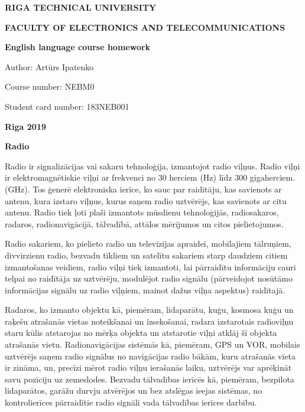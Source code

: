 \documentclass[a4paper, twoside, 12pt]{book}
\begin{document}
\thispagestyle{empty}

{\centering
	\MakeUppercase{\textbf{Riga Technical University}} \par
	\vspace{6pt}
	\MakeUppercase{\textbf{Faculty of electronics and telecommunications}} \par
	\vspace{200pt}
	{\large \textbf{English language course homework}} \par
}

\vspace{120pt}

\hfill Author: Artūrs Ipatenko

\hfill Course number: NEBM0

\hfill Student card number: 183NEB001

\vfill{}
{\centering \textbf{Riga 2019} \par}

\newpage

{\noindent \textbf{Radio}}
\vspace{6pt}

Radio ir signalizācijas vai sakaru tehnoloģija, izmantojot radio viļņus. Radio viļņi ir elektromagnētiskie viļņi ar frekvenci no 30 herciem (Hz) līdz 300 gigaherciem. (GHz). Tos ģenerē elektroniska ierīce, ko sauc par raidītāju, kas savienots ar antenu, kura izstaro viļņus, kurus saņem radio uztvērējs, kas savienots ar citu antenu. Radio tiek ļoti plaši izmantots mūsdienu tehnoloģijās, radiosakaros, radaros, radionavigācijā, tālvadībā, attālos mērījumos un citos pielietojumos.

Radio sakariem, ko pielieto radio un televīzijas apraidei, mobilajiem tālruņiem, divvirzienu radio, bezvadu tīkliem un satelītu sakariem starp daudziem citiem izmantošanas veidiem, radio viļņi tiek izmantoti, lai pārraidītu informāciju cauri telpai no raidītāja uz uztvērēju, modulējot radio signālu (pārveidojot nosūtāmo informācijas signālu uz radio viļņiem, mainot dažus viļņa aspektus) raidītajā.

Radaros, ko izmanto objektu kā, piemēram, lidaparātu, kuģu, kosmosa kuģu un raķešu atrašanās vietas noteikšanai un izsekošanai, radara izstarotais radioviļņu staru kūlis atstarojas no mērķa objekta un atstarotie viļņi atklāj šī objekta atrašanās vietu. Radionavigācijas sistēmās kā, piemēram, GPS un VOR, mobilais uztvērējs saņem radio signālus no navigācijas radio bākām, kuru atrašanās vieta ir zināma, un, precīzi mērot radio viļņu ierašanās laiku, uztvērējs var aprēķināt savu pozīciju uz zemeslodes. Bezvadu tālvadības ierīcēs kā, piemēram, bezpilota lidaparātos, garāžu durvju atvērējos un bez atslēgas ieejas sistēmas, no kontrolierīces pārraidītie radio signāli vada tālvadības ierīces darbību.
\end{document}
